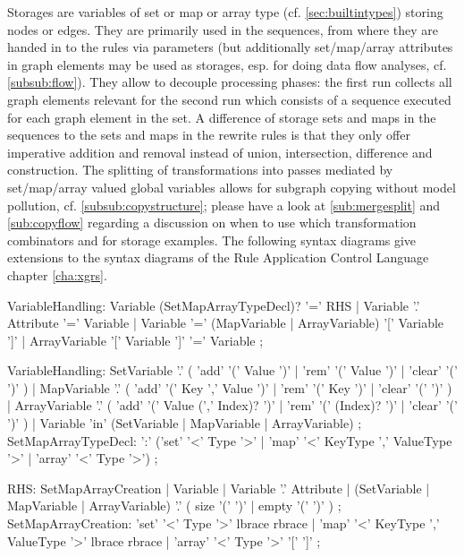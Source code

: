 Storages are variables of set or map or array type (cf. \ref{sec:builtintypes}) storing nodes or edges.
They are primarily used in the sequences, from where they are handed in to the rules via parameters
(but additionally set/map/array attributes in graph elements may be used as storages,
esp. for doing data flow analyses, cf. \ref{subsub:flow}).
They allow to decouple processing phases: the first run collects all graph elements relevant for the second run which consists of a sequence executed for each graph element in the set.
A difference of storage sets and maps in the sequences to the sets and maps in the rewrite rules is that they only offer imperative addition and removal instead of union, intersection, difference and construction.
The splitting of transformations into passes mediated by set/map/array valued global variables allows for subgraph copying without model pollution, cf. \ref{subsub:copystructure}; please have a look at \ref{sub:mergesplit} and \ref{sub:copyflow} regarding a discussion on when to use which transformation combinators and for storage examples.
The following syntax diagrams give extensions to the syntax diagrams of the Rule Application Control Language chapter \ref{cha:xgrs}.

\begin{rail}
  VariableHandling: 
    Variable (SetMapArrayTypeDecl)? '=' RHS |
    Variable '.' Attribute '=' Variable |
    Variable '=' (MapVariable | ArrayVariable) '[' Variable ']' |
    ArrayVariable '[' Variable ']' '=' Variable
    ;
\end{rail}
 
\begin{rail}
  VariableHandling: 
    SetVariable '.' ( 'add' '(' Value ')' | 'rem' '(' Value ')' | 'clear' '(' ')' ) |
    MapVariable '.' ( 'add' '(' Key ',' Value ')' | 'rem' '(' Key ')' | 'clear' '(' ')' ) |
    ArrayVariable '.' ( 'add' '(' Value (',' Index)? ')' | 'rem' '(' (Index)? ')' | 'clear' '(' ')' ) |
    Variable 'in' (SetVariable | MapVariable | ArrayVariable)
    ;
  SetMapArrayTypeDecl: 
    ':' ('set' '<' Type '>' | 'map' '<' KeyType ',' ValueType '>' | 'array' '<' Type '>')
    ;
\end{rail}%

\begin{rail}
  RHS:
    SetMapArrayCreation |
    Variable |
    Variable '.' Attribute |
    (SetVariable | MapVariable | ArrayVariable) '.' ( size '(' ')' | empty '(' ')' )
    ;
  SetMapArrayCreation:
    'set' '<' Type '>' lbrace rbrace |
    'map' '<' KeyType ',' ValueType '>' lbrace rbrace |
    'array' '<' Type '>' '[' ']'
	;
\end{rail}\makeatother


